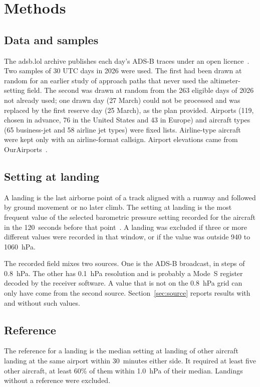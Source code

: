 \documentclass[11pt]{article}
\begin{document}
\section{Methods}\label{sec:methods}

\subsection{Data and samples}

The adsb.lol archive publishes each day's ADS-B traces under an open licence~\cite{adsblol}. Two samples of 30 UTC days in 2026 were used. The first had been drawn at random for an earlier study of approach paths that never used the altimeter-setting field. The second was drawn at random from the 263 eligible days of 2026 not already used; one drawn day (27 March) could not be processed and was replaced by the first reserve day (25 March), as the plan provided. Airports (119, chosen in advance, 76 in the United States and 43 in Europe) and aircraft types (65 business-jet and 58 airline jet types) were fixed lists. Airline-type aircraft were kept only with an airline-format callsign. Airport elevations came from OurAirports~\cite{ourairports}.

\subsection{Setting at landing}

A landing is the last airborne point of a track aligned with a runway and followed by ground movement or no later climb. The setting at landing is the most frequent value of the selected barometric pressure setting recorded for the aircraft in the 120~seconds before that point~\cite{readsb}. A landing was excluded if three or more different values were recorded in that window, or if the value was outside 940 to 1060~hPa.

The recorded field mixes two sources. One is the ADS-B broadcast, in steps of 0.8~hPa. The other has 0.1~hPa resolution and is probably a Mode~S register decoded by the receiver software. A value that is not on the 0.8~hPa grid can only have come from the second source. Section~\ref{sec:source} reports results with and without such values.

\subsection{Reference}

The reference for a landing is the median setting at landing of other aircraft landing at the same airport within 30~minutes either side. It required at least five other aircraft, at least 60\% of them within 1.0~hPa of their median. Landings without a reference were excluded.
\end{document}
